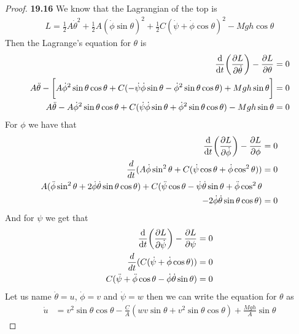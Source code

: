 \documentclass[11pt]{article}
\theoremstyle{definition}
\begin{document}
\cleardoublepage
\begin{proof}{\textbf{19.16}}
    We know that the Lagrangian of the top is
    \begin{align*}
        L = \frac{1}{2}A\dot\theta^2 + \frac{1}{2}A(\dot\phi\sin\theta)^2
        + \frac{1}{2}C(\dot\psi + \dot\phi\cos\theta)^2 - Mgh\cos\theta
    \end{align*}
    Then the Lagrange's equation for $\theta$ is
    \begin{align*}
        \derivative{}{t}\bigg(\partialderivative{L}{\dot\theta}\bigg)
        - \partialderivative{L}{\theta} = 0\\
        A\ddot\theta
        - \bigg[A\dot\phi^2\sin\theta\cos\theta
        + C(-\dot\psi\dot\phi\sin\theta - \dot\phi^2\sin\theta\cos\theta)
        + Mgh\sin\theta\bigg] = 0\\
        A\ddot\theta
        - A\dot\phi^2\sin\theta\cos\theta
        + C(\dot\psi\dot\phi\sin\theta + \dot\phi^2\sin\theta\cos\theta)
        - Mgh\sin\theta = 0
    \end{align*}
    For $\phi$ we have that
    \begin{align*}
        \derivative{}{t}\bigg(\partialderivative{L}{\dot\phi}\bigg)
        - \partialderivative{L}{\phi} &= 0\\
        \frac{d}{dt}
        (A\dot\phi\sin^2\theta + C(\dot\psi\cos\theta + \dot\phi\cos^2\theta))
        &= 0\\
        A(\ddot\phi\sin^2\theta + 2\dot\phi\dot\theta\sin\theta\cos\theta)
        + C(\ddot\psi\cos\theta - \dot\psi\dot\theta\sin\theta
        + \ddot\phi\cos^2\theta&\\
        - 2\dot\phi\dot\theta\sin\theta\cos\theta) &= 0
    \end{align*}
    And for $\psi$ we get that
    \begin{align*}
        \derivative{}{t}\bigg(\partialderivative{L}{\dot\psi}\bigg)
        - \partialderivative{L}{\psi} &= 0\\
        \frac{d}{dt}(C(\dot\psi + \dot\phi\cos\theta)) &= 0\\
        C(\ddot\psi + \ddot\phi\cos\theta - \dot\phi\dot\theta\sin\theta) &= 0
    \end{align*}
    Let us name $\dot\theta = u$, $\dot\phi = v$ and $\dot\psi = w$ then
    we can write the equation for $\theta$ as
    \begin{align*}
        \dot u &= 
        v^2\sin\theta\cos\theta
        - \frac{C}{A}(wv\sin\theta + v^2\sin\theta\cos\theta)
        + \frac{Mgh}{A}\sin\theta

\end{align*}
\end{proof}
\end{document}
